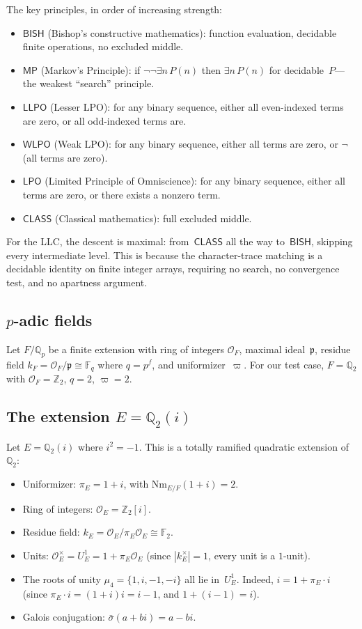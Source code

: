 \documentclass[11pt]{article}
\theoremstyle{plain}
\theoremstyle{definition}
\theoremstyle{remark}
\newcommand{\Z}{\mathbb{Z}}
\newcommand{\Q}{\mathbb{Q}}
\newcommand{\F}{\mathbb{F}}
\newcommand{\Qp}{\Q_p}
\newcommand{\calO}{\mathcal{O}}
\newcommand{\fp}{\mathfrak{p}}
\newcommand{\Nm}{\mathrm{Nm}}
\newcommand{\BISH}{\mathsf{BISH}}
\newcommand{\LPO}{\mathsf{LPO}}
\newcommand{\WLPO}{\mathsf{WLPO}}
\newcommand{\LLPO}{\mathsf{LLPO}}
\newcommand{\MP}{\mathsf{MP}}
\newcommand{\CLASS}{\mathsf{CLASS}}
\begin{document}
The key principles, in order of increasing strength:
\begin{itemize}[nosep]
\item $\BISH$ (Bishop's constructive mathematics): function
  evaluation, decidable finite operations, no excluded middle.
\item $\MP$ (Markov's Principle): if $\neg\neg\exists n\, P(n)$
  then $\exists n\, P(n)$ for decidable~$P$---the weakest
  ``search'' principle.
\item $\LLPO$ (Lesser LPO): for any binary sequence, either
  all even-indexed terms are zero, or all odd-indexed terms are.
\item $\WLPO$ (Weak LPO): for any binary sequence, either all
  terms are zero, or $\neg$(all terms are zero).
\item $\LPO$ (Limited Principle of Omniscience): for any binary
  sequence, either all terms are zero, or there exists a
  nonzero term.
\item $\CLASS$ (Classical mathematics): full excluded middle.
\end{itemize}

For the LLC, the descent is maximal: from~$\CLASS$ all the way
to~$\BISH$, skipping every intermediate level.  This is because
the character-trace matching is a decidable identity on finite
integer arrays, requiring no search, no convergence test, and
no apartness argument.

\subsection{$p$-adic fields}\label{ssec:padic}

Let $F/\Qp$ be a finite extension with ring of integers
$\calO_F$, maximal ideal~$\fp$, residue field
$k_F = \calO_F/\fp \cong \F_q$ where $q = p^f$, and
uniformizer~$\varpi$.  For our test case,
$F = \Q_2$ with $\calO_F = \Z_2$, $q = 2$, $\varpi = 2$.

\subsection{The extension $E = \Q_2(i)$}\label{ssec:ext}

Let $E = \Q_2(i)$ where $i^2 = -1$.  This is a totally
ramified quadratic extension of~$\Q_2$:
\begin{itemize}[nosep]
\item Uniformizer: $\pi_E = 1+i$, with $\Nm_{E/F}(1+i) = 2$.
\item Ring of integers: $\calO_E = \Z_2[i]$.
\item Residue field: $k_E = \calO_E/\pi_E\calO_E \cong \F_2$.
\item Units: $\calO_E^\times = U_E^1 = 1 + \pi_E \calO_E$
  (since $|k_E^\times| = 1$, every unit is a $1$-unit).
\item The roots of unity $\mu_4 = \{1, i, -1, -i\}$ all lie
  in~$U_E^1$.  Indeed, $i = 1 + \pi_E \cdot i$ (since
  $\pi_E \cdot i = (1+i)i = i - 1$, and
  $1 + (i-1) = i$).
\item Galois conjugation: $\bar\sigma(a+bi) = a - bi$.
\end{itemize}
\end{document}
